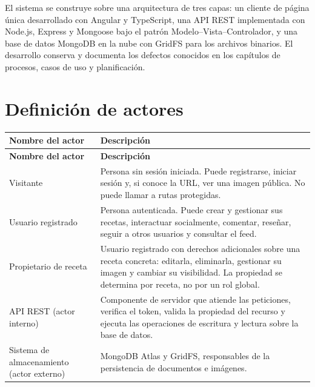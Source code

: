 \documentclass[doc,12pt,a4paper]{apa7}
\begin{document}
El sistema se construye sobre una arquitectura de tres capas: un cliente de página única desarrollado con Angular y TypeScript, una API REST implementada con Node.js, Express y Mongoose bajo el patrón Modelo--Vista--Controlador, y una base de datos MongoDB en la nube con GridFS para los archivos binarios. El desarrollo conserva y documenta los defectos conocidos en los capítulos de procesos, casos de uso y planificación.

\section{Definición de actores}

\begin{longtable}{|P{3.3cm}|L{11.2cm}|}
\hline
\textbf{Nombre del actor} & \textbf{Descripción} \\ \hline
\endfirsthead
\hline
\textbf{Nombre del actor} & \textbf{Descripción} \\ \hline
\endhead
\hline
\endfoot

Visitante & Persona sin sesión iniciada. Puede registrarse, iniciar sesión y, si conoce la URL, ver una imagen pública. No puede llamar a rutas protegidas. \\ \hline

Usuario registrado & Persona autenticada. Puede crear y gestionar sus recetas, interactuar socialmente, comentar, reseñar, seguir a otros usuarios y consultar el feed. \\ \hline

Propietario de receta & Usuario registrado con derechos adicionales sobre una receta concreta: editarla, eliminarla, gestionar su imagen y cambiar su visibilidad. La propiedad se determina por receta, no por un rol global. \\ \hline

API REST (actor interno) & Componente de servidor que atiende las peticiones, verifica el token, valida la propiedad del recurso y ejecuta las operaciones de escritura y lectura sobre la base de datos. \\ \hline

Sistema de almacenamiento (actor externo) & MongoDB Atlas y GridFS, responsables de la persistencia de documentos e imágenes. \\ \hline

\end{longtable}
\end{document}
